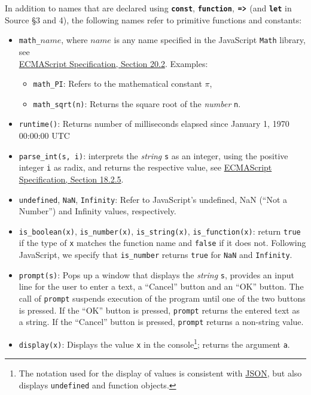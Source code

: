 In addition to names that
are declared using \texttt{\textbf{const}}, \texttt{\textbf{function}},
$\texttt{\textbf{=>}}$ (and \texttt{\textbf{let}} in Source \S3 and 4), the following
names refer to primitive functions and constants:
\begin{itemize}
\item \lstinline{math_}$\textit{name}$,
where $\textit{name}$ is any name specified in the
JavaScript
\texttt{Math} library, see\\
\href{https://www.ecma-international.org/ecma-262/9.0/index.html#sec-math-object}{\color{DarkBlue}ECMAScript Specification, Section 20.2}. Examples:
\begin{itemize}
\item \verb#math_PI#: Refers to the mathematical constant $\pi$,
\item \verb#math_sqrt#\texttt{(n)}: Returns the square root of the \emph{number} \texttt{n}.
\end{itemize}
\item \texttt{runtime()}: Returns number of milliseconds elapsed since January 1, 1970 00:00:00 UTC
\item \verb#parse_int#\texttt{(s, i)}:
interprets the \emph{string} \texttt{s} as an integer, using the positive integer \texttt{i} as radix, and returns the respective value,
see \href{https://www.ecma-international.org/ecma-262/9.0/index.html#sec-parseint-string-radix}{\color{DarkBlue}ECMAScript Specification, Section 18.2.5}.
\item \verb#undefined#, \verb#NaN#, \verb#Infinity#: Refer to JavaScript's undefined,
NaN (``Not a Number'') and Infinity values, respectively.
\item \verb#is_boolean#\texttt{(x)}, \verb#is_number#\texttt{(x)}, \verb#is_string#\texttt{(x)}, \verb#is_function#\texttt{(x)}:
        return \texttt{true} if the type of \texttt{x} matches the function name and \texttt{false} if it does not. Following
        JavaScript, we specify that \verb#is_number# returns \texttt{true} for \texttt{NaN} and \texttt{Infinity}.
\item \texttt{prompt(s)}: Pops up a window that displays the \emph{string} \texttt{s}, provides
an input line for the user to enter a text, a ``Cancel'' button and an ``OK'' button. The call of \texttt{prompt}
suspends execution of the program until one of the two buttons is pressed. If 
the ``OK'' button is pressed, \texttt{prompt} returns the entered text as a string.
If the ``Cancel'' button is pressed, \texttt{prompt} returns a non-string value.
\item \texttt{display(x)}: Displays the value \texttt{x} in the console\footnote{The notation used for the display of values is consistent with \href{http://www.ecma-international.org/publications/files/ECMA-ST/ECMA-404.pdf}{JSON}, but also displays \texttt{undefined} and function objects.}; returns the argument \texttt{a}.  

\end{itemize}
